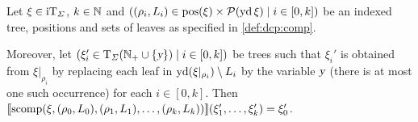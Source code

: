 \documentclass[../../document.tex]{subfiles}
\begin{document}

    \begin{lemma}
        Let \(\xi \in \operatorname{iT}_{\varSigma}\), \(k \in \mathbb{N}\) and \(((\rho_i, L_i) \in \operatorname{pos}(\xi) \times \mathcal{P}(\operatorname{yd}{\xi}) \mid i \in [0,k])\) be an indexed tree, positions and sets of leaves as specified in \cref{def:dcp:comp}.

        Moreover, let \((\xi_i' \in \operatorname{T}_\varSigma(\mathbb{N}_+ \cup \{\textsl{y}\}) \mid i \in [0,k])\) be trees such that \(\xi_i'\) is obtained from \(\xi|_{\rho_i}\) by replacing each leaf in \(\operatorname{yd}(\xi|_{\rho_i}) \setminus L_i\) by the variable \(\textsl{y}\) (there is at most one such occurrence) for each \(i \in [0,k]\).
        Then \(\llbracket\mathrm{scomp}(\xi, (\rho_0, L_0), (\rho_1, L_1), \ldots, (\rho_k, L_k))\rrbracket(\xi_1', \ldots, \xi_k') = \xi_0'\).
    \end{lemma}
\end{document}
